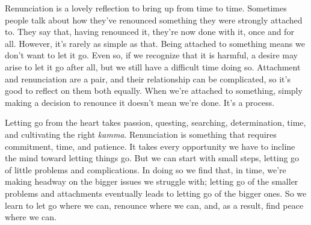 
Renunciation is a lovely reflection to bring up from time to time. 
Sometimes people talk about how they've renounced something they were 
strongly attached to. They say that, having renounced it, they're now 
done with it, once and for all. However, it's rarely as simple as that. 
Being attached to something means we don't want to let it go. Even so, 
if we recognize that it is harmful, a desire may arise to let it go 
after all, but we still have a difficult time doing so. Attachment and 
renunciation are a pair, and their relationship can be complicated, so 
it's good to reflect on them both equally. When we're attached to 
something, simply making a decision to renounce it doesn't mean we're 
done. It's a process.

Letting go from the heart takes passion, questing, searching, 
determination, time, and cultivating the right \emph{kamma}. 
Renunciation is something that requires commitment, time, and patience. 
It takes every opportunity we have to incline the mind toward letting 
things go. But we can start with small steps, letting go of little 
problems and complications. In doing so we find that, in time, we're 
making headway on the bigger issues we struggle with; letting go of the 
smaller problems and attachments eventually leads to letting go of the 
bigger ones. So we learn to let go where we can, renounce where we can, 
and, as a result, find peace where we can.

